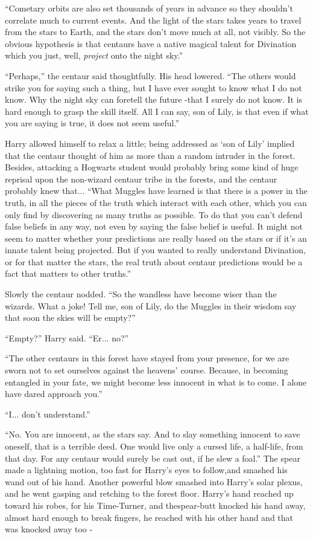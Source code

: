 “Cometary orbits are also set thousands of years in advance so they shouldn't correlate much to current events. And the light of the stars takes years to travel from the stars to Earth, and the stars don't move much at all, not visibly. So the obvious hypothesis is that centaurs have a native magical talent for Divination which you just, well, \emph{project} onto the night sky.”

“Perhaps,” the centaur said thoughtfully. His head lowered. “The others would strike you for saying such a thing, but I have ever sought to know what I do not know. Why the night sky can foretell the future -that I surely do not know. It is hard enough to grasp the skill itself. All I can say, son of Lily, is that even if what you are saying is true, it does not seem useful.”

Harry allowed himself to relax a little; being addressed as `son of Lily' implied that the centaur thought of him as more than a random intruder in the forest. Besides, attacking a Hogwarts student would probably bring some kind of huge reprisal upon the non-wizard centaur tribe in the forests, and the centaur probably knew that... “What Muggles have learned is that there is a power in the truth, in all the pieces of the truth which interact with each other, which you can only find by discovering as many truths as possible. To do that you can't defend false beliefs in any way, not even by saying the false belief is useful. It might not seem to matter whether your predictions are really based on the stars or if it's an innate talent being projected. But if you wanted to really understand Divination, or for that matter the stars, the real truth about centaur predictions would be a fact that matters to other truths.”

Slowly the centaur nodded. “So the wandless have become wiser than the wizards. What a joke! Tell me, son of Lily, do the Muggles in their wisdom say that soon the skies will be empty?”

“Empty?” Harry said. “Er... no?”

“The other centaurs in this forest have stayed from your presence, for we are sworn not to set ourselves against the heavens' course. Because, in becoming entangled in your fate, we might become less innocent in what is to come. I alone have dared approach you.”

“I... don't understand.”

“No. You are innocent, as the stars say. And to slay something innocent to save oneself, that is a terrible deed. One would live only a cursed life, a half-life, from that day. For any centaur would surely be cast out, if he slew a foal.”
The spear made a lightning motion, too fast for Harry's eyes to follow,and smashed his wand out of his hand.
Another powerful blow smashed into Harry's solar plexus, and he went gasping and retching to the forest floor.
Harry's hand reached up toward his robes, for his Time-Turner, and thespear-butt knocked his hand away, almost hard enough to break fingers, he reached with his other hand and that was knocked away too -

